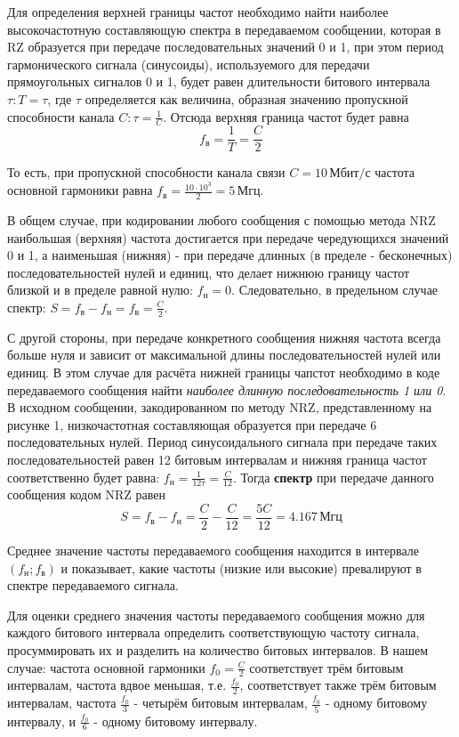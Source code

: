 Для определения верхней границы частот необходимо найти наиболее высокочастотную составляющую спектра в передаваемом сообщении, которая в RZ образуется при передаче последовательных значений 0 и 1, при этом период гармонического сигнала (синусоиды), используемого для передачи прямоугольных сигналов 0 и 1, будет равен длительности битового интервала $\tau: T = \tau$, где $\tau$ определяется как величина, образная значению пропускной способности канала $C: \tau = \frac{1}{C}$. Отсюда верхняя граница частот будет равна \[f_{\text{в}} = \frac{1}{T} = \frac{C}{2}\]

То есть, при пропускной способности канала связи $C = 10 \, \text{Мбит/с}$ частота основной гармоники равна $f_{\text{в}} = \frac{10 \cdot 10^3}{2} = 5 \, \text{Мгц}$.

В общем случае, при кодировании любого сообщения с помощью метода NRZ наибольшая (верхняя) частота достигается при передаче чередующихся значений 0 и 1, а наименьшая (нижняя) - при передаче длинных (в пределе - бесконечных) последовательностей нулей и единиц, что делает нижнюю границу частот близкой и в пределе равной нулю: $f_{\text{н}} = 0$. Следовательно, в предельном случае спектр: $S = f_{\text{в}} - f_{\text{н}} = f_{\text{в}} = \frac{C}{2}$.

С другой стороны, при передаче конкретного сообщения нижняя частота всегда больше нуля и зависит от максимальной длины последовательностей нулей или единиц. В этом случае для расчёта нижней границы чапстот необходимо в коде передаваемого сообщения найти \textit{наиболее длинную последовательность 1 или 0}. В исходном сообщении, закодированном по методу NRZ, представленному на рисунке 1, низкочастотная составляющая образуется при передаче 6 последовательных нулей. Период синусоидального сигнала при передаче таких последовательностей равен 12 битовым интервалам и нижняя граница частот соответственно будет равна: $f_{\text{н}} = \frac{1}{12\tau} = \frac{C}{12}$. Тогда \textbf{спектр} при передаче данного сообщения кодом NRZ равен
\[
	S =  f_{\text{в}} - f_{\text{н}} = \frac{C}{2} - \frac{C}{12} = \frac{5C}{12} = 4.167 \, \text{Мгц}
\]

Среднее значение частоты передаваемого сообщения находится в интервале $(f_{\text{н}};f_{\text{в}})$ и показывает, какие частоты (низкие или высокие) превалируют в спектре передаваемого сигнала.

Для оценки среднего значения частоты передаваемого сообщения можно для каждого битового интервала определить соответствующую частоту сигнала, просуммировать их и разделить на количество битовых интервалов. В нашем случае: частота основной гармоники $f_0 = \frac{C}{2}$ соответствует трём битовым интервалам, частота вдвое меньшая, т.е. $\frac{f_0}{2}$, соответствует также трём битовым интервалам, частота $\frac{f_0}{3}$ - четырём битовым интервалам, $\frac{f_0}{5}$ - одному битовому интервалу, и $\frac{f_0}{6}$ - одному битовому интервалу.

